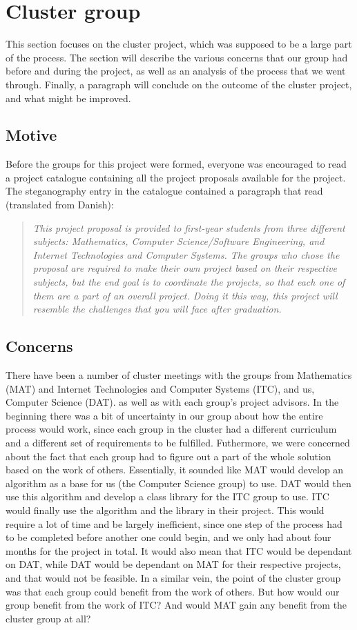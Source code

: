 \section{Cluster group}
This section focuses on the cluster project, which was supposed to be a large part of the process. The section will describe the various concerns that our group had before and during the project, as well as an analysis of the process that we went through. Finally, a paragraph will conclude on the outcome of the cluster project, and what might be improved.

\subsection{Motive}
Before the groups for this project were formed, everyone was encouraged to read a project catalogue containing all the project proposals available for the project.
The steganography entry in the catalogue contained a paragraph that read (translated from Danish):
\begin{quote}\textit{This project proposal is provided to first-year students from three different subjects: Mathematics, Computer Science/Software Engineering, and Internet Technologies and Computer Systems.
The groups who chose the proposal are required to make their own project based on their respective subjects, but the end goal is to coordinate the projects, so that each one of them are a part of an overall project.
Doing it this way, this project will resemble the challenges that you will face after graduation.}\end{quote}

\subsection{Concerns}
There have been a number of cluster meetings with the groups from Mathematics (MAT) and Internet Technologies and Computer Systems (ITC), and us, Computer Science (DAT). as well as with each group's project advisors.
In the beginning there was a bit of uncertainty in our group about how the entire process would work, since each group in the cluster had a different curriculum and a different set of requirements to be fulfilled.
Futhermore, we were concerned about the fact that each group had to figure out a part of the whole solution based on the work of others.
Essentially, it sounded like MAT would develop an algorithm as a base for us (the Computer Science group) to use.
DAT would then use this algorithm and develop a class library for the ITC group to use.
ITC would finally use the algorithm and the library in their project.
This would require a lot of time and be largely inefficient, since one step of the process had to be completed before another one could begin, and we only had about four months for the project in total.
It would also mean that ITC would be dependant on DAT, while DAT would be dependant on MAT for their respective projects, and that would not be feasible.
In a similar vein, the point of the cluster group was that each group could benefit from the work of others.
But how would our group benefit from the work of ITC? And would MAT gain any benefit from the cluster group at all?

